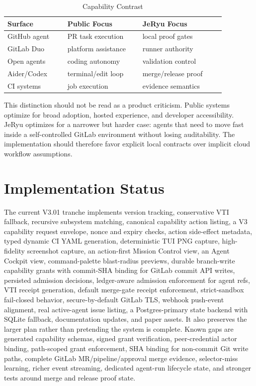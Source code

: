 \documentclass[conference]{IEEEtran}
\begin{document}
\begin{table}[t]
\caption{Capability Contrast}
\centering
\footnotesize
\setlength{\tabcolsep}{2pt}
\begin{tabular}{p{0.24\linewidth}p{0.30\linewidth}p{0.33\linewidth}}
\toprule
Surface & Public Focus & JeRyu Focus\\
\midrule
GitHub agent & PR task execution & local proof gates\\
GitLab Duo & platform assistance & runner authority\\
Open agents & coding autonomy & validation control\\
Aider/Codex & terminal/edit loop & merge/release proof\\
CI systems & job execution & evidence semantics\\
\bottomrule
\end{tabular}
\end{table}

This distinction should not be read as a product criticism. Public systems optimize for broad adoption, hosted experience, and developer accessibility. JeRyu optimizes for a narrower but harder case: agents that need to move fast inside a self-controlled GitLab environment without losing auditability. The implementation should therefore favor explicit local contracts over implicit cloud workflow assumptions.

\section{Implementation Status}
The current V3.01 tranche implements version tracking, conservative VTI fallback, recursive subsystem matching, canonical capability action listing, a V3 capability request envelope, nonce and expiry checks, action side-effect metadata, typed dynamic CI YAML generation, deterministic TUI PNG capture, high-fidelity screenshot capture, an action-first Mission Control view, an Agent Cockpit view, command-palette blast-radius previews, durable branch-write capability grants with commit-SHA binding for GitLab commit API writes, persisted admission decisions, ledger-aware admission enforcement for agent refs, VTI receipt generation, default merge-gate receipt enforcement, strict-sandbox fail-closed behavior, secure-by-default GitLab TLS, webhook push-event alignment, real active-agent issue listing, a Postgres-primary state backend with SQLite fallback, documentation updates, and paper assets. It also preserves the larger plan rather than pretending the system is complete. Known gaps are generated capability schemas, signed grant verification, peer-credential actor binding, path-scoped grant enforcement, SHA binding for non-commit Git write paths, complete GitLab MR/pipeline/approval merge evidence, selector-miss learning, richer event streaming, dedicated agent-run lifecycle state, and stronger tests around merge and release proof state.
\end{document}
